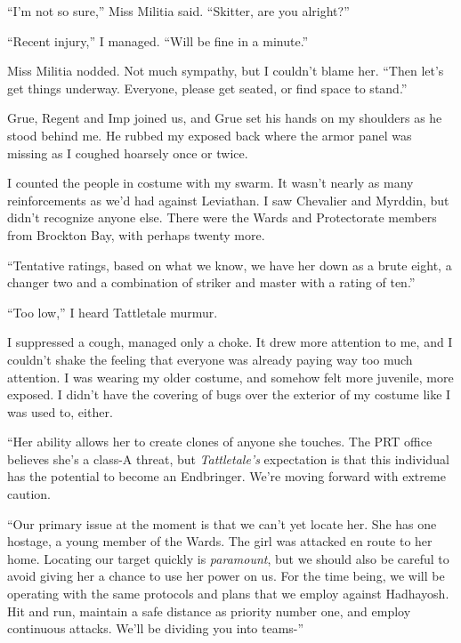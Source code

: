 ``I'm not so sure,'' Miss Militia said.  ``Skitter, are you alright?''



``Recent injury,'' I managed.  ``Will be fine in a minute.''



Miss Militia nodded.  Not much sympathy, but I couldn't blame her.  ``Then let's get things underway.  Everyone, please get seated, or find space to stand.''



Grue, Regent and Imp joined us, and Grue set his hands on my shoulders as he stood behind me.  He rubbed my exposed back where the armor panel was missing as I coughed hoarsely once or twice.



I counted the people in costume with my swarm.  It wasn't nearly as many reinforcements as we'd had against Leviathan.  I saw Chevalier and Myrddin, but didn't recognize anyone else.  There were the Wards and Protectorate members from Brockton Bay, with perhaps twenty more.



``Tentative ratings, based on what we know, we have her down as a brute eight, a changer two and a combination of striker and master with a rating of ten.''



``Too low,'' I heard Tattletale murmur.



I suppressed a cough, managed only a choke.  It drew more attention to me, and I couldn't shake the feeling that everyone was already paying way too much attention.  I was wearing my older costume, and somehow felt more juvenile, more exposed.  I didn't have the covering of bugs over the exterior of my costume like I was used to, either.



``Her ability allows her to create clones of anyone she touches.  The PRT office believes she's a class-A threat, but \emph{Tattletale's} expectation is that this individual has the potential to become an Endbringer.  We're moving forward with extreme caution.



``Our primary issue at the moment is that we can't yet locate her.  She has one hostage, a young member of the Wards.  The girl was attacked en route to her home.  Locating our target quickly is \emph{paramount}, but we should also be careful to avoid giving her a chance to use her power on us.  For the time being, we will be operating with the same protocols and plans that we employ against Hadhayosh.  Hit and run, maintain a safe distance as priority number one, and employ continuous attacks.  We'll be dividing you into teams-''



